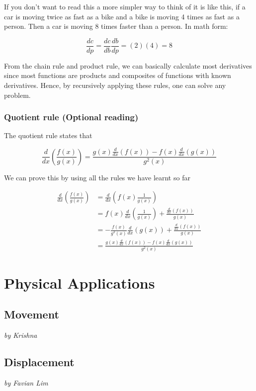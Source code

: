 \documentclass[a4paper,12pt,oneside]{book}
\begin{document}
\noindent If you don't want to read this a more simpler way to think of it is like this, if a car is moving twice as fast as a bike and a bike is moving 4 times as fast as a person. Then a car is moving 8 times faster than a person. In math form:

$$\frac{dc}{dp}=\frac{dc}{db}\frac{db}{dp}=(2)(4)=8$$

\noindent From the chain rule and product rule, we can basically calculate most derivatives since most functions are products and composites of functions with known derivatives. Hence, by recursively applying these rules, one can solve any problem.

\section{Quotient rule (Optional reading)}

The quotient rule states that

$$\frac{d}{dx}\left(\frac{f(x)}{g(x)}\right) = \frac{g(x)\frac{d}{dx}(f(x))-f(x)\frac{d}{dx}(g(x))}{g^2(x)}$$

\noindent We can prove this by using all the rules we have learnt so far

$$\begin{aligned}
\frac{d}{dx}\left(\frac{f(x)}{g(x)}\right)&=\frac{d}{dx}\left(f(x)\frac{1}{g(x)}\right)\\
&=f(x)\frac{d}{dx}\left(\frac{1}{g(x)}\right)+\frac{\frac{d}{dx}(f(x))}{g(x)}\\
&=-\frac{f(x)}{g^2(x)}\frac{d}{dx}(g(x))+\frac{\frac{d}{dx}(f(x))}{g(x)}\\
&=\frac{g(x)\frac{d}{dx}(f(x))-f(x)\frac{d}{dx}(g(x))}{g^2(x)}
\end{aligned}$$

\part{Physical Applications}

\newpage
\chapter{Movement}
\vspace{-30pt}
\large \textit{by Krishna}


\newpage
\chapter{Displacement}
\vspace{-30pt}
\large \textit{by Favian Lim}
\end{document}
